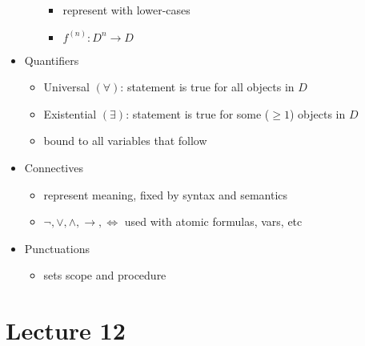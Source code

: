\documentclass[11pt]{article}
\begin{document}
\begin{itemize}
\begin{itemize}
        \begin{itemize}
            \item represent with lower-cases 
            \item $f^{(n)}: D^n\rightarrow D$
        \end{itemize}
    \end{itemize}
    \item Quantifiers
    \begin{itemize}
        \item Universal $(\forall)$: statement is true for all objects in $D$
        \item Existential $(\exists)$: statement is true for some ($\geq1$) objects in $D$ 
        \item bound to all variables that follow 
    \end{itemize}
    \item Connectives 
    \begin{itemize}
        \item represent meaning, fixed by syntax and semantics 
        \item $\neg, \lor, \land, \rightarrow, \iff$ used with atomic formulas, vars, etc 
    \end{itemize}
    \item Punctuations 
    \begin{itemize}
        \item sets scope and procedure 
    \end{itemize}
\end{itemize}

\section{Lecture 12}
\end{document}
